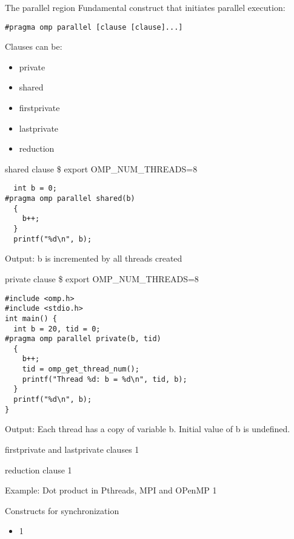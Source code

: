 \documentclass[14pt]{beamer}
\begin{document}
\begin{frame}[fragile]{The parallel region}
Fundamental construct that initiates parallel execution:
\begin{Verbatim}
#pragma omp parallel [clause [clause]...]
\end{Verbatim}
Clauses can be:
\begin{itemize}
\item private
\item shared
\item firstprivate
\item lastprivate
\item reduction
\end{itemize}
\end{frame}

\begin{frame}[fragile]{shared clause}
\$ export OMP\_NUM\_THREADS=8
\begin{Verbatim}
  int b = 0;
#pragma omp parallel shared(b)
  {
    b++;
  }
  printf("%d\n", b);
\end{Verbatim}
Output: b is incremented by all threads created
\end{frame}

\begin{frame}[fragile]{private clause}
\$ export OMP\_NUM\_THREADS=8
\begin{Verbatim}
#include <omp.h>
#include <stdio.h>
int main() {
  int b = 20, tid = 0;
#pragma omp parallel private(b, tid)
  {
    b++;
    tid = omp_get_thread_num();
    printf("Thread %d: b = %d\n", tid, b);
  }
  printf("%d\n", b);
}
\end{Verbatim}
Output: Each thread has a copy of variable b. Initial value of b is undefined.
\end{frame}

\begin{frame}[fragile]{firstprivate and lastprivate clauses}
1
\end{frame}

\begin{frame}[fragile]{reduction clause}
1
\end{frame}


\begin{frame}[fragile]{Example: Dot product in Pthreads, MPI and OPenMP}
1
\end{frame}

\begin{frame}{Constructs for synchronization}
\begin{itemize}
\item 1
\end{itemize}
\end{frame}
\end{document}
